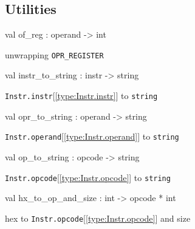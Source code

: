 \documentclass[11pt]{article}
\begin{document}
\subsection{Utilities}




\label{val:Instr.of-underscorereg}\begin{ocamldoccode}
val of_reg : operand -> int
\end{ocamldoccode}
\begin{ocamldocdescription}
unwrapping {\tt{OPR\_REGISTER}}


\end{ocamldocdescription}




\label{val:Instr.instr-underscoreto-underscorestring}\begin{ocamldoccode}
val instr_to_string : instr -> string
\end{ocamldoccode}
\begin{ocamldocdescription}
{\tt{Instr.instr}}[\ref{type:Instr.instr}] to {\tt{string}}


\end{ocamldocdescription}




\label{val:Instr.opr-underscoreto-underscorestring}\begin{ocamldoccode}
val opr_to_string : operand -> string
\end{ocamldoccode}
\begin{ocamldocdescription}
{\tt{Instr.operand}}[\ref{type:Instr.operand}] to {\tt{string}}


\end{ocamldocdescription}




\label{val:Instr.op-underscoreto-underscorestring}\begin{ocamldoccode}
val op_to_string : opcode -> string
\end{ocamldoccode}
\begin{ocamldocdescription}
{\tt{Instr.opcode}}[\ref{type:Instr.opcode}] to {\tt{string}}


\end{ocamldocdescription}




\label{val:Instr.hx-underscoreto-underscoreop-underscoreand-underscoresize}\begin{ocamldoccode}
val hx_to_op_and_size : int -> opcode * int
\end{ocamldoccode}
\begin{ocamldocdescription}
hex to {\tt{Instr.opcode}}[\ref{type:Instr.opcode}] and size


\end{ocamldocdescription}
\end{document}
